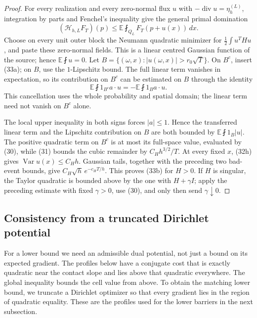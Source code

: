 \documentclass{smfart}
\theoremstyle{definition}
\newcommand{\1}{\mathbf 1}
\begin{document}
\begin{proof}
For every realization and every zero-normal flux $u$ with
$-\operatorname {div}u=\eta_ h^{(L)}$, integration by parts and
Fenchel's inequality give the general primal domination
\begin{equation}
(\mathcal H_ {h,L}F_ T)(p)
\leq\mathbb E\fint_ {Q_ L}F_ T(p+u(x))\,dx.
\tag{33c}
\end{equation}
Choose on every unit outer block the Neumann quadratic minimizer for
$\frac12\int u^THu$, and paste these zero-normal fields.  This is a
linear centred Gaussian function of the source; hence
$\mathbb E\fint u=0$.  Let
$B=\{(\omega,x):|u(\omega,x)|>r_ 0\sqrt T\}$.  On $B^c$, insert
(33a); on $B$, use the $1$-Lipschitz bound.  The full linear term
vanishes in expectation, so its contribution on $B^c$ can be estimated
on $B$ through the identity
\begin{equation*}
\mathbb E\fint 1_ {B^c}a\cdot u
=-\mathbb E\fint1_ Ba\cdot u.
\end{equation*}
This cancellation uses the whole probability and spatial domain; the
linear term need not vanish on $B^c$ alone.

The local upper inequality in both signs forces $|a|\leq1$.
Hence the transferred linear term and the Lipschitz contribution on
$B$ are both bounded by $\mathbb E\fint1_ B|u|$.  The positive
quadratic term on $B^c$ is at most its full-space value, evaluated by
(30), while (31) bounds the cubic remainder by $C_ Hh^{3/2}/T$.
At every fixed $x$, (32h) gives
$\operatorname {Var}u(x)\leq C_ Hh$.  Gaussian tails, together with
the preceding two bad-event bounds, give
$C_ H\sqrt h\,e^{-c_ HT/h}$.  This proves (33b) for $H>0$.  If $H$ is singular,
the Taylor quadratic is bounded above by the one with $H+\gamma I$;
apply the preceding estimate with fixed $\gamma>0$, use (30), and only
then send $\gamma\downarrow0$.

\end{proof}

\subsection{Consistency from a truncated Dirichlet potential}

For a lower bound we need an admissible dual potential, not just a
bound on its expected gradient.  The profiles below have a conjugate
cost that is exactly quadratic near the contact slope and lies above
that quadratic everywhere.  The global inequality bounds the cell
value from above.  To obtain the matching lower bound, we truncate a
Dirichlet optimizer so that every gradient lies in the region of
quadratic equality.  These are the profiles used for the lower
barriers in the next subsection.
\end{document}
